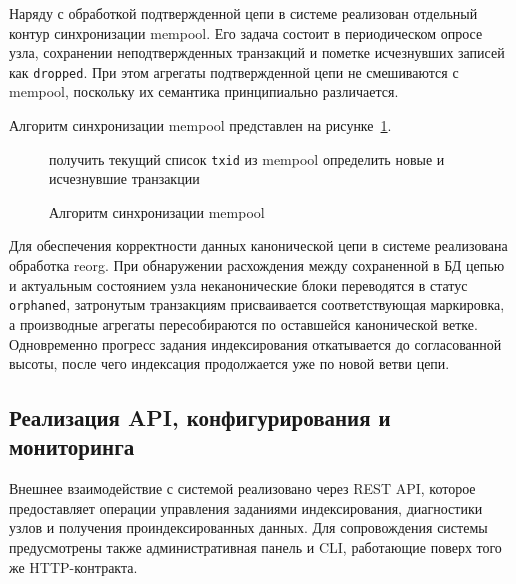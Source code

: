 Наряду с обработкой подтвержденной цепи в системе реализован отдельный контур
синхронизации mempool. Его задача состоит в периодическом опросе узла,
сохранении неподтвержденных транзакций и пометке исчезнувших записей как
\texttt{dropped}. При этом агрегаты подтвержденной цепи не смешиваются с mempool,
поскольку их семантика принципиально различается.

Алгоритм синхронизации mempool представлен на
рисунке~\ref{alg:mempool-sync}.

\begin{figure}
\begin{minipage}{\linewidth}
\begin{algorithm}[H]
    \SetAlgoVlined
    получить текущий список \texttt{txid} из mempool\;
    определить новые и исчезнувшие транзакции\;
\end{algorithm}
\end{minipage}
\caption{Алгоритм синхронизации mempool}
\label{alg:mempool-sync}
\end{figure}

Для обеспечения корректности данных канонической цепи в системе реализована обработка
reorg. При обнаружении расхождения между сохраненной в БД цепью и актуальным
состоянием узла неканонические блоки переводятся в статус \texttt{orphaned},
затронутым транзакциям присваивается соответствующая маркировка, а производные
агрегаты пересобираются по оставшейся канонической ветке. Одновременно
прогресс задания индексирования откатывается до согласованной высоты, после чего индексация
продолжается уже по новой ветви цепи.

\subsection{Реализация API, конфигурирования и мониторинга}

Внешнее взаимодействие с системой реализовано через REST API, которое
предоставляет операции управления заданиями индексирования, диагностики узлов и получения
проиндексированных данных. Для сопровождения системы предусмотрены также
административная панель и CLI, работающие поверх того же HTTP-контракта.

